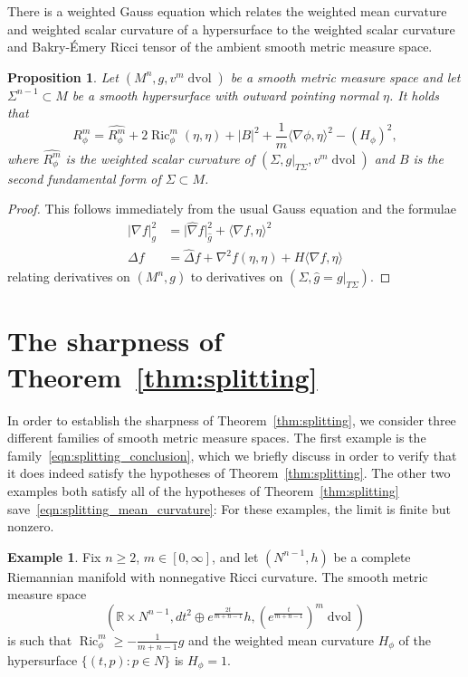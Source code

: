 \documentclass{amsart}
\newtheorem{prop}[thm]{Proposition}
\theoremstyle{definition}
\newtheorem{example}[thm]{Example}
\theoremstyle{remark}
\numberwithin{equation}{section}
\begin{document}
There is a weighted Gauss equation which relates the weighted mean curvature and weighted scalar curvature of a hypersurface to the weighted scalar curvature and Bakry-\'Emery Ricci tensor of the ambient smooth metric measure space.

\begin{prop}
Let $(M^n,g,v^m\operatorname{dvol})$ be a smooth metric measure space and let $\Sigma^{n-1}\subset M$ be a smooth hypersurface with outward pointing normal $\eta$.  It holds that
\begin{equation}
\label{eqn:weighted_gauss}
R_\phi^m = \widehat{R_\phi^m} + 2\operatorname{Ric}_\phi^m(\eta,\eta) + {\lvert} B{\rvert}^2 + \frac{1}{m}{\langle}\nabla\phi,\eta{\rangle}^2 - (H_\phi)^2 ,
\end{equation}
where $\widehat{R_\phi^m}$ is the weighted scalar curvature of $(\Sigma,g{\rvert}_{T\Sigma},v^m\operatorname{dvol})$ and $B$ is the second fundamental form of $\Sigma\subset M$.
\end{prop}

\begin{proof}

This follows immediately from the usual Gauss equation and the formulae
\begin{align*}
{\lvert}\nabla f{\rvert}_g^2 & = {\lvert}\hat\nabla f{\rvert}_{\hat g}^2 + {\langle}\nabla f,\eta{\rangle}^2 \\
\Delta f & = \widehat{\Delta}f + \nabla^2f(\eta,\eta) + H{\langle}\nabla f,\eta{\rangle}
\end{align*}
relating derivatives on $(M^n,g)$ to derivatives on $(\Sigma,\hat g=g{\rvert}_{T\Sigma})$.
\end{proof}

\section{The sharpness of Theorem~\ref{thm:splitting}}
\label{sec:sharp}

In order to establish the sharpness of Theorem~\ref{thm:splitting}, we consider three different families of smooth metric measure spaces.  The first example is the family~\eqref{eqn:splitting_conclusion}, which we briefly discuss in order to verify that it does indeed satisfy the hypotheses of Theorem~\ref{thm:splitting}.  The other two examples both satisfy all of the hypotheses of Theorem~\ref{thm:splitting} save~\eqref{eqn:splitting_mean_curvature}: For these examples, the limit is finite but nonzero.

\begin{example}
\label{ex:hyperbolic_cusp}
Fix $n\geq 2$, $m\in[0,\infty]$, and let $(N^{n-1},h)$ be a complete Riemannian manifold with nonnegative Ricci curvature.  The smooth metric measure space
\begin{equation}
\label{eqn:negative_cusp}
\left( {\mathbb{R}}\times N^{n-1}, dt^2\oplus e^{\frac{2t}{m+n-1}}h, \left(e^{\frac{t}{m+n-1}}\right)^m\operatorname{dvol}\right)
\end{equation}
is such that $\operatorname{Ric}_\phi^m\geq-\frac{1}{m+n-1}g$ and the weighted mean curvature $H_\phi$ of the hypersurface $\{(t,p)\colon p\in N\}$ is $H_\phi=1$.
\end{example}
\end{document}

